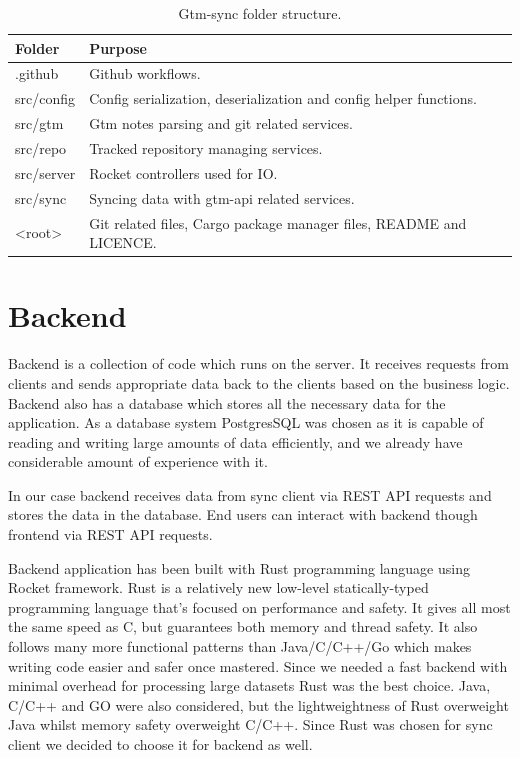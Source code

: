 \begin{table}[h]
    \centering
    \begin{tabular}{ | p{3cm} | p{10cm} |}
        \hline
        Folder & Purpose\\
        \hline
        .github & Github workflows.\\
        \hline
        src/config & Config serialization, deserialization and config helper functions.\\
        \hline
        src/gtm & Gtm notes parsing and git related services.\\
        \hline
        src/repo & Tracked repository managing services.\\
        \hline
        src/server & Rocket controllers used for IO.\\
        \hline
        src/sync & Syncing data with gtm-api related services.\\
        \hline
        <root> & Git related files, Cargo package manager files, README and LICENCE.\\
        \hline
    \end{tabular}
    \caption{Gtm-sync folder structure.}
    \label{tab:gtm-sync-folder-structure}
\end{table}

\section{Backend}\label{sec:backend}
Backend is a collection of code which runs on the server.
It receives requests from clients and sends appropriate data back to the clients based on the business logic.
Backend also has a database which stores all the necessary data for the application.
As a database system PostgresSQL was chosen as it is capable of reading and writing large amounts of data efficiently, and we already have considerable amount of experience with it.

In our case backend receives data from sync client via REST API requests and stores the data in the database.
End users can interact with backend though frontend via REST API requests.

Backend application has been built with Rust programming language using Rocket framework.
Rust is a relatively new low-level statically-typed programming language that's focused on performance and safety.
It gives all most the same speed as C, but guarantees both memory and thread safety.
It also follows many more functional patterns than Java/C/C++/Go which makes writing code easier and safer once mastered.
Since we needed a fast backend with minimal overhead for processing large datasets Rust was the best choice.
Java, C/C++ and GO were also considered, but the lightweightness of Rust overweight Java whilst memory safety overweight C/C++.
Since Rust was chosen for sync client we decided to choose it for backend as well.

